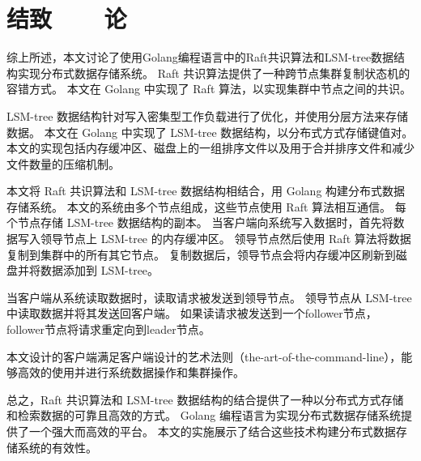 \section*{结致\ \ \ \ 论}

综上所述，本文讨论了使用Golang编程语言中的Raft共识算法和LSM-tree数据结构实现分布式数据存储系统。 Raft 共识算法提供了一种跨节点集群复制状态机的容错方式。 本文在 Golang 中实现了 Raft 算法，以实现集群中节点之间的共识。

	LSM-tree 数据结构针对写入密集型工作负载进行了优化，并使用分层方法来存储数据。 本文在 Golang 中实现了 LSM-tree 数据结构，以分布式方式存储键值对。 本文的实现包括内存缓冲区、磁盘上的一组排序文件以及用于合并排序文件和减少文件数量的压缩机制。
	
	本文将 Raft 共识算法和 LSM-tree 数据结构相结合，用 Golang 构建分布式数据存储系统。 本文的系统由多个节点组成，这些节点使用 Raft 算法相互通信。 每个节点存储 LSM-tree 数据结构的副本。 当客户端向系统写入数据时，首先将数据写入领导节点上 LSM-tree 的内存缓冲区。 领导节点然后使用 Raft 算法将数据复制到集群中的所有其它节点。 复制数据后，领导节点会将内存缓冲区刷新到磁盘并将数据添加到 LSM-tree。
	
	当客户端从系统读取数据时，读取请求被发送到领导节点。 领导节点从 LSM-tree 中读取数据并将其发送回客户端。 如果读请求被发送到一个follower节点，follower节点将请求重定向到leader节点。
	
	本文设计的客户端满足客户端设计的艺术法则（the-art-of-the-command-line），能够高效的使用并进行系统数据操作和集群操作。
	
	总之，Raft 共识算法和 LSM-tree 数据结构的结合提供了一种以分布式方式存储和检索数据的可靠且高效的方式。 Golang 编程语言为实现分布式数据存储系统提供了一个强大而高效的平台。 本文的实施展示了结合这些技术构建分布式数据存储系统的有效性。
	

	
		
	
		 
	
\clearpage